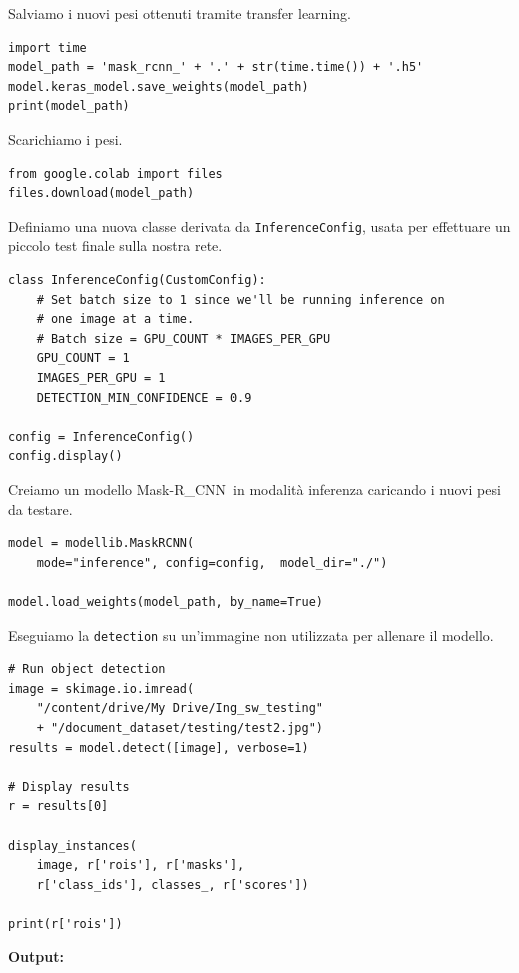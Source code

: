\documentclass[12pt,a4paper]{article}
\newcommand{\mrcnn}{Mask-R\_CNN}
\begin{document}
Salviamo i nuovi pesi ottenuti tramite transfer learning.

\begin{verbatim}
import time
model_path = 'mask_rcnn_' + '.' + str(time.time()) + '.h5'
model.keras_model.save_weights(model_path)
print(model_path)
\end{verbatim}

Scarichiamo i pesi.

\begin{verbatim}
from google.colab import files
files.download(model_path)
\end{verbatim}

Definiamo una nuova classe derivata da \texttt{InferenceConfig}, usata
per effettuare un piccolo test finale sulla nostra rete.

\begin{verbatim}
class InferenceConfig(CustomConfig):
    # Set batch size to 1 since we'll be running inference on
    # one image at a time.
    # Batch size = GPU_COUNT * IMAGES_PER_GPU
    GPU_COUNT = 1
    IMAGES_PER_GPU = 1
    DETECTION_MIN_CONFIDENCE = 0.9

config = InferenceConfig()
config.display()
\end{verbatim}

Creiamo un modello \mrcnn\ in modalità inferenza caricando i nuovi pesi
da testare.

\begin{verbatim}
model = modellib.MaskRCNN(
    mode="inference", config=config,  model_dir="./")

model.load_weights(model_path, by_name=True)
\end{verbatim}

Eseguiamo la \texttt{detection} su un'immagine non utilizzata per
allenare il modello.

\begin{verbatim}
# Run object detection
image = skimage.io.imread(
    "/content/drive/My Drive/Ing_sw_testing"
    + "/document_dataset/testing/test2.jpg")
results = model.detect([image], verbose=1)

# Display results
r = results[0]

display_instances(
    image, r['rois'], r['masks'],
    r['class_ids'], classes_, r['scores'])

print(r['rois'])
\end{verbatim}

\pagebreak

\textbf{\large Output:}
\end{document}
